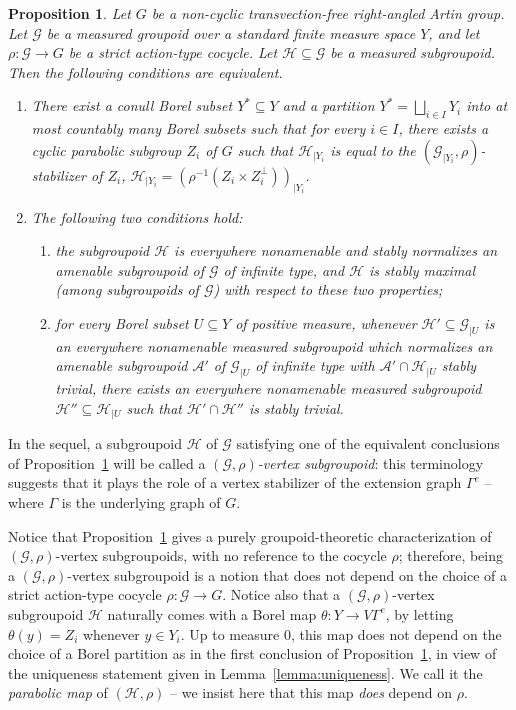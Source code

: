 \documentclass[JEP,XML,SOM,Unicode,NoFloatCountersInSection,published]{cedram}
\let\mathcal\mathscr
\theoremstyle{plain}
\newtheorem{prop}[theo]{Proposition}
\theoremstyle{definition}
\let\Dunion\bigsqcup
\newcommand{\cala}{\mathcal{A}}
\newcommand{\calg}{\mathcal{G}}
\newcommand{\calh}{\mathcal{H}}
\begin{document}
\begin{prop}
\label{prop:raag}
Let $G$ be a non-cyclic transvection-free right-angled Artin group. Let $\calg$ be a measured groupoid over a standard finite measure space $Y$, and let \hbox{$\rho:\calg\!\to\!G$} be a strict action-type cocycle. Let $\calh\subseteq\calg$ be a measured subgroupoid. Then the following conditions are equivalent.
\begin{enumerate}
\item\label{prop:raag1} There exist a conull Borel subset $Y^*\subseteq Y$ and a partition $Y^*=\Dunion_{i\in I}Y_i$ into at most countably many Borel subsets such that for every $i\in I$, there exists a cyclic parabolic subgroup $Z_i$ of $G$ such that $\calh_{|Y_i}$ is equal to the $(\calg_{|Y_i},\rho)$-stabilizer of $Z_i$, \ie $\calh_{|Y_i}=(\rho^{-1}(Z_i\times Z_i^{\perp}))_{|Y_i}$.
\item\label{prop:raag2} The following two conditions hold:
\begin{enumerate}
\item\label{prop:raag2a} the subgroupoid $\calh$ is everywhere nonamenable and stably normalizes an amenable subgroupoid of $\calg$ of infinite type, and $\calh$ is stably maximal (among subgroupoids of $\calg$) with respect to these two properties;
\item\label{prop:raag2b} for every Borel subset $U\subseteq Y$ of positive measure, whenever $\calh'\subseteq\calg_{|U}$ is an everywhere nonamenable measured subgroupoid which normalizes an amenable subgroupoid $\cala'$ of $\calg_{|U}$ of infinite type with $\cala'\cap\calh_{|U}$ stably trivial, there exists an everywhere nonamenable measured subgroupoid $\calh''\subseteq\calh_{|U}$ such that $\calh'\cap\calh''$ is stably trivial.
\end{enumerate}
\end{enumerate}
\end{prop}

In the sequel, a subgroupoid $\calh$ of $\calg$ satisfying one of the equivalent conclusions of Proposition~\ref{prop:raag} will be called a \emph{$(\calg,\rho)$-vertex subgroupoid}: this terminology suggests that it plays the role of a vertex stabilizer of the extension graph $\Gamma^e$ -- where $\Gamma$ is the underlying graph of $G$.

Notice that Proposition~\ref{prop:raag} gives a purely groupoid-theoretic characterization of $(\calg,\rho)$-vertex subgroupoids, with no reference to the cocycle $\rho$; therefore, being a $(\calg,\rho)$-vertex subgroupoid is a notion that does not depend on the choice of a strict action-type cocycle $\rho:\calg\to G$. Notice also that a $(\calg,\rho)$-vertex subgroupoid $\calh$ naturally comes with a Borel map $\theta:Y\to V\Gamma^e$, by letting $\theta(y)=Z_i$ whenever $y\in Y_i$. Up to measure $0$, this map does not depend on the choice of a Borel partition as in the first conclusion of Proposition~\ref{prop:raag}, in view of the uniqueness statement given in Lemma~\ref{lemma:uniqueness}. We call it the \emph{parabolic map} of $(\calh,\rho)$ -- we insist here that this map \emph{does} depend on $\rho$.
\end{document}
